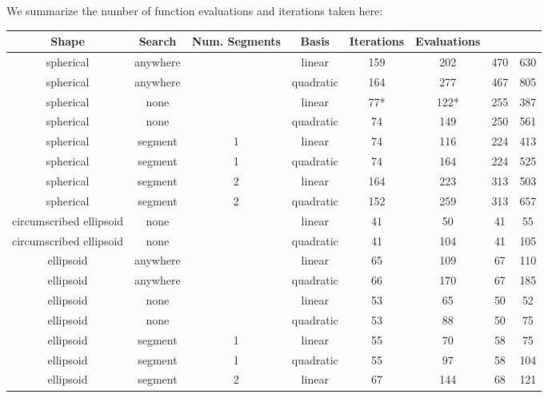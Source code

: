 We summarize the number of function evaluations and iterations taken here:
\tiny
\begin{center}
\begin{longtable}{ c c c c c c c c }
Shape & Search & Num. Segments & Basis & Iterations & Evaluations \\
\hline
                spherical &   anywhere &       &     linear & 159  &   202  &  470 &  630 \\
                spherical &   anywhere &       &  quadratic & 164  &   277  &  467 &  805 \\
                spherical &       none &       &     linear &  77* &   122* &  255 &  387 \\
                spherical &       none &       &  quadratic &  74  &   149  &  250 &  561 \\
                spherical &    segment &     1 &     linear &  74  &   116  &  224 &  413 \\
                spherical &    segment &     1 &  quadratic &  74  &   164  &  224 &  525 \\
                spherical &    segment &     2 &     linear & 164  &   223  &  313 &  503 \\
                spherical &    segment &     2 &  quadratic & 152  &   259  &  313 &  657 \\
  circumscribed ellipsoid &       none &       &     linear &  41  &    50  &   41 &   55 \\
  circumscribed ellipsoid &       none &       &  quadratic &  41  &   104  &   41 &  105 \\
                ellipsoid &   anywhere &       &     linear &  65  &   109  &   67 &  110 \\
                ellipsoid &   anywhere &       &  quadratic &  66  &   170  &   67 &  185 \\
                ellipsoid &       none &       &     linear &  53  &    65  &   50 &   52 \\
                ellipsoid &       none &       &  quadratic &  53  &    88  &   50 &   75 \\
                ellipsoid &    segment &     1 &     linear &  55  &    70  &   58 &   75 \\
                ellipsoid &    segment &     1 &  quadratic &  55  &    97  &   58 &  104 \\
                ellipsoid &    segment &     2 &     linear &  67  &   144  &   68 &  121 \\

\end{longtable}
\end{center}
